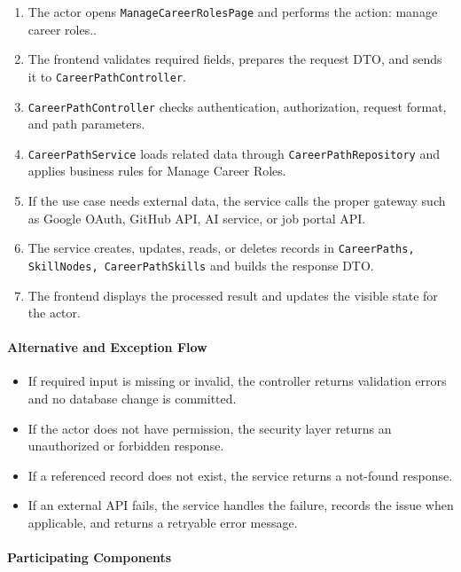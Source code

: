 \begin{enumerate}
    \item The actor opens \texttt{ManageCareerRolesPage} and performs the action: manage career roles..
    \item The frontend validates required fields, prepares the request DTO, and sends it to \texttt{CareerPathController}.
    \item \texttt{CareerPathController} checks authentication, authorization, request format, and path parameters.
    \item \texttt{CareerPathService} loads related data through \texttt{CareerPathRepository} and applies business rules for Manage Career Roles.
    \item If the use case needs external data, the service calls the proper gateway such as Google OAuth, GitHub API, AI service, or job portal API.
    \item The service creates, updates, reads, or deletes records in \texttt{CareerPaths, SkillNodes, CareerPathSkills} and builds the response DTO.
    \item The frontend displays the processed result and updates the visible state for the actor.
\end{enumerate}

\paragraph{Alternative and Exception Flow}

\begin{itemize}
    \item If required input is missing or invalid, the controller returns validation errors and no database change is committed.
    \item If the actor does not have permission, the security layer returns an unauthorized or forbidden response.
    \item If a referenced record does not exist, the service returns a not-found response.
    \item If an external API fails, the service handles the failure, records the issue when applicable, and returns a retryable error message.
\end{itemize}

\paragraph{Participating Components}

